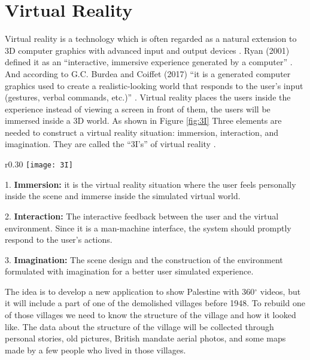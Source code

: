 
\section{Virtual Reality} 
Virtual reality is a technology which is often regarded as a natural extension to 3D computer graphics with advanced input and output devices \citep{Jayaram1997}. Ryan (2001) defined it as an “interactive, immersive experience generated by a computer” \citep{Ryan2001}. And according to G.C. Burdea and Coiffet (2017) “it is a generated computer graphics used to create a realistic-looking world that responds to the user’s input (gestures, verbal commands, etc.)” \citep{burdea2017virtual}. Virtual reality places the users inside the experience instead of viewing a screen in front of them, the users will be immersed inside a 3D world. As shown in Figure \ref{fig:3I} Three elements are needed to construct a virtual reality situation: immersion, interaction, and imagination. They are called the “3I’s” of virtual reality \citep{Hu2016}.


\begin{wrapfigure}{r}{0.30\textwidth} %
    \centering
    \texttt{[image: 3I]}
    \caption{The 3I's of Virtual Reality - © 2003 by John Wiley \& Sons Inc. All rights
reserved}
    \label{fig:3I}
\end{wrapfigure}

1. \textbf{Immersion:} it is the virtual reality situation where the user feels personally inside the
scene and immerse inside the simulated virtual world.



2. \textbf{Interaction:} The interactive feedback between the user
and the virtual environment. Since it is a man-machine
interface, the system should promptly respond to the
user’s actions.


3. \textbf{Imagination:} The scene design and the construction of
the environment formulated with imagination for a
better user simulated experience.


  
  
  
The idea is to develop a new application to show Palestine with 360$^{\circ}$ videos, but it will include a part of one of the demolished villages before 1948. To rebuild one of those villages we need to know the structure of the village and how it looked like. The data about the structure of the village will be collected through personal stories, old pictures, British mandate aerial photos, and some maps made by a few people who lived in those villages. 
  
